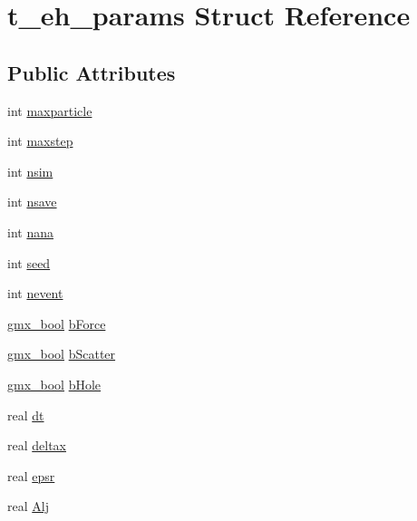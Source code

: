 \hypertarget{structt__eh__params}{\section{t\-\_\-eh\-\_\-params \-Struct \-Reference}
\label{structt__eh__params}
}
\subsection*{\-Public \-Attributes}
\begin{DoxyCompactItemize}
\item 
int \hyperlink{structt__eh__params_ab416b4a919a3aa58bcb03184adc3e824}{maxparticle}
\item 
int \hyperlink{structt__eh__params_a280985ee8c0ca4053d1782e82de0332e}{maxstep}
\item 
int \hyperlink{structt__eh__params_a67c791b67efb788568ae41fb700cd01e}{nsim}
\item 
int \hyperlink{structt__eh__params_a41ece27e3eba52ae5d76a823326e0011}{nsave}
\item 
int \hyperlink{structt__eh__params_aa971146e01bb8c4c4918af97f14a12d8}{nana}
\item 
int \hyperlink{structt__eh__params_a4cac9bc411e9ea7d8f0b86f2b8c69239}{seed}
\item 
int \hyperlink{structt__eh__params_af723b0dbcc101c878beb7f06fb91c97f}{nevent}
\item 
\hyperlink{include_2types_2simple_8h_a8fddad319f226e856400d190198d5151}{gmx\-\_\-bool} \hyperlink{structt__eh__params_adf4411453e3053a4b30784a70517c63c}{b\-Force}
\item 
\hyperlink{include_2types_2simple_8h_a8fddad319f226e856400d190198d5151}{gmx\-\_\-bool} \hyperlink{structt__eh__params_a23fb5a49f41ca4cedf01f1ed322cee1e}{b\-Scatter}
\item 
\hyperlink{include_2types_2simple_8h_a8fddad319f226e856400d190198d5151}{gmx\-\_\-bool} \hyperlink{structt__eh__params_ade68f2b0f7e625d4c3adb487dafb5c8c}{b\-Hole}
\item 
real \hyperlink{structt__eh__params_a6f1e00edab1f3f4fc268cab4929cf21c}{dt}
\item 
real \hyperlink{structt__eh__params_af004e1bc99a04ba0f8ff2ab4598dfd6d}{deltax}
\item 
real \hyperlink{structt__eh__params_a456ac3871a91c47e3d7d0b80be352eb5}{epsr}
\item 
real \hyperlink{structt__eh__params_adbc1ac4d0795a2407f59c250440d53f2}{\-Alj}
\item 

\end{DoxyCompactItemize}
